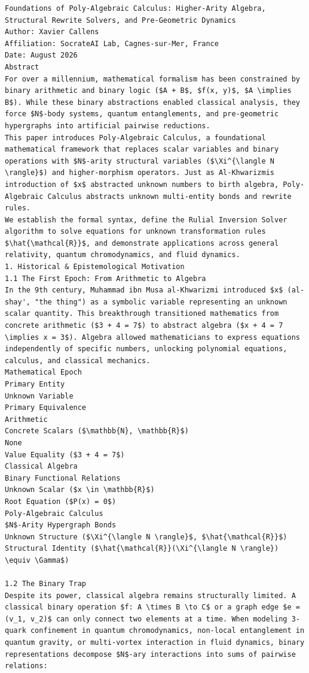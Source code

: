 \documentclass[11pt,a4paper]{article}
\begin{document}
\begin{lstlisting}[language={}, caption={}, basicstyle=\ttfamily\footnotesize, breaklines=true]
Foundations of Poly-Algebraic Calculus: Higher-Arity Algebra, Structural Rewrite Solvers, and Pre-Geometric Dynamics
Author: Xavier Callens
Affiliation: SocrateAI Lab, Cagnes-sur-Mer, France
Date: August 2026
Abstract
For over a millennium, mathematical formalism has been constrained by binary arithmetic and binary logic ($A + B$, $f(x, y)$, $A \implies B$). While these binary abstractions enabled classical analysis, they force $N$-body systems, quantum entanglements, and pre-geometric hypergraphs into artificial pairwise reductions.
This paper introduces Poly-Algebraic Calculus, a foundational mathematical framework that replaces scalar variables and binary operations with $N$-arity structural variables ($\Xi^{\langle N \rangle}$) and higher-morphism operators. Just as Al-Khwarizmis introduction of $x$ abstracted unknown numbers to birth algebra, Poly-Algebraic Calculus abstracts unknown multi-entity bonds and rewrite rules.
We establish the formal syntax, define the Rulial Inversion Solver algorithm to solve equations for unknown transformation rules $\hat{\mathcal{R}}$, and demonstrate applications across general relativity, quantum chromodynamics, and fluid dynamics.
1. Historical & Epistemological Motivation
1.1 The First Epoch: From Arithmetic to Algebra
In the 9th century, Muhammad ibn Musa al-Khwarizmi introduced $x$ (al-shay', "the thing") as a symbolic variable representing an unknown scalar quantity. This breakthrough transitioned mathematics from concrete arithmetic ($3 + 4 = 7$) to abstract algebra ($x + 4 = 7 \implies x = 3$). Algebra allowed mathematicians to express equations independently of specific numbers, unlocking polynomial equations, calculus, and classical mechanics.
Mathematical Epoch
Primary Entity
Unknown Variable
Primary Equivalence
Arithmetic
Concrete Scalars ($\mathbb{N}, \mathbb{R}$)
None
Value Equality ($3 + 4 = 7$)
Classical Algebra
Binary Functional Relations
Unknown Scalar ($x \in \mathbb{R}$)
Root Equation ($P(x) = 0$)
Poly-Algebraic Calculus
$N$-Arity Hypergraph Bonds
Unknown Structure ($\Xi^{\langle N \rangle}$, $\hat{\mathcal{R}}$)
Structural Identity ($\hat{\mathcal{R}}(\Xi^{\langle N \rangle}) \equiv \Gamma$)

1.2 The Binary Trap
Despite its power, classical algebra remains structurally limited. A classical binary operation $f: A \times B \to C$ or a graph edge $e = (v_1, v_2)$ can only connect two elements at a time. When modeling 3-quark confinement in quantum chromodynamics, non-local entanglement in quantum gravity, or multi-vortex interaction in fluid dynamics, binary representations decompose $N$-ary interactions into sums of pairwise relations:


\end{lstlisting}
\end{document}
